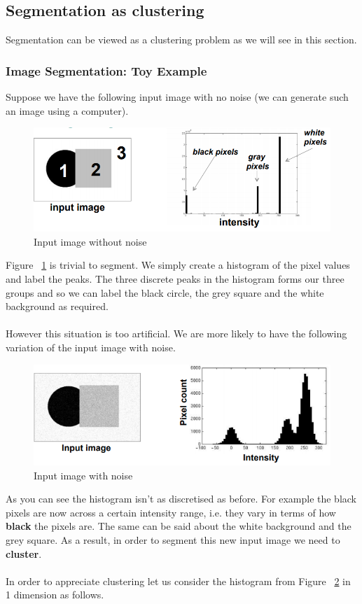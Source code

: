 \documentclass{article}
\begin{document}
\subsection{Segmentation as clustering}
Segmentation can be viewed as a clustering problem as we will see in this section.
\subsubsection{Image Segmentation: Toy Example}
Suppose we have the following input image with no noise (we can generate such an image using a computer).

\begin{figure}[htp]
    \centering
    \includegraphics[width=12cm]{slide_14_1}
    \caption{Input image without noise}
    \label{fig:Slide14_1}
\end{figure}

Figure ~\ref{fig:Slide14_1} is trivial to segment. We simply create a histogram of the pixel values and label the peaks. The three discrete peaks in the histogram forms our three groups and so we can label the black circle, the grey square and the white background as required.
\\\\
However this situation is too artificial. We are more likely to have the following variation of the input image with noise.

\begin{figure}[htp]
    \centering
    \includegraphics[width=12cm]{slide_16_1}
    \caption{Input image with noise}
    \label{fig:Slide16_1}
\end{figure}

As you can see the histogram isn't as discretised as before. For example the black pixels are now across a certain intensity range, i.e. they vary in terms of how \textbf{black} the pixels are. The same can be said about the white background and the grey square. As a result, in order to segment this new input image we need to \textbf{cluster}.
\\\\
In order to appreciate clustering let us consider the histogram from Figure ~\ref{fig:Slide16_1} in 1 dimension as follows.
\end{document}
